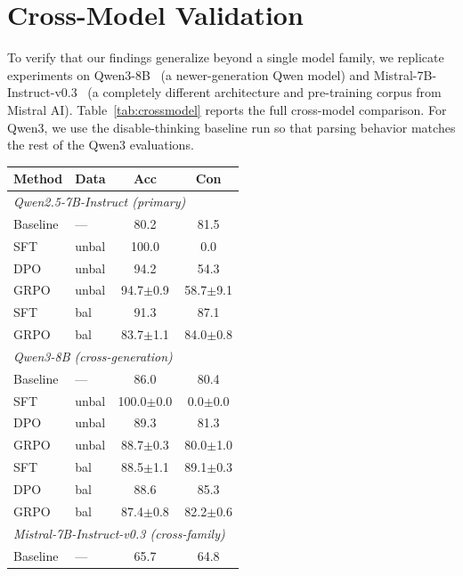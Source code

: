 \documentclass[letterpaper]{article}
\begin{document}
\section{Cross-Model Validation}
\label{app:crossmodel}

To verify that our findings generalize beyond a single model family, we replicate experiments on Qwen3-8B~\citep{qwen2025qwen3} (a newer-generation Qwen model) and Mistral-7B-Instruct-v0.3~\citep{jiang2023mistral} (a completely different architecture and pre-training corpus from Mistral AI). Table~\ref{tab:crossmodel} reports the full cross-model comparison. For Qwen3, we use the disable-thinking baseline run so that parsing behavior matches the rest of the Qwen3 evaluations.

\begin{table}[htbp]
\centering
\footnotesize
\begin{tabular}{llcc}
\toprule
\textbf{Method} & \textbf{Data} & \textbf{Acc} & \textbf{Con} \\
\midrule
\multicolumn{4}{l}{\textit{Qwen2.5-7B-Instruct (primary)}} \\
Baseline & --- & 80.2 & 81.5 \\
SFT & unbal & 100.0 & 0.0 \\
DPO & unbal & 94.2 & 54.3 \\
GRPO & unbal & 94.7{\scriptsize$\pm$0.9} & 58.7{\scriptsize$\pm$9.1} \\
SFT & bal & 91.3 & 87.1 \\
GRPO & bal & 83.7{\scriptsize$\pm$1.1} & 84.0{\scriptsize$\pm$0.8} \\
\midrule
\multicolumn{4}{l}{\textit{Qwen3-8B (cross-generation)}} \\
Baseline & --- & 86.0 & 80.4 \\
SFT & unbal & 100.0{\scriptsize$\pm$0.0} & 0.0{\scriptsize$\pm$0.0} \\
DPO & unbal & 89.3 & 81.3 \\
GRPO & unbal & 88.7{\scriptsize$\pm$0.3} & 80.0{\scriptsize$\pm$1.0} \\
SFT & bal & 88.5{\scriptsize$\pm$1.1} & 89.1{\scriptsize$\pm$0.3} \\
DPO & bal & 88.6 & 85.3 \\
GRPO & bal & 87.4{\scriptsize$\pm$0.8} & 82.2{\scriptsize$\pm$0.6} \\
\midrule
\multicolumn{4}{l}{\textit{Mistral-7B-Instruct-v0.3 (cross-family)}} \\
Baseline & --- & 65.7 & 64.8 \\

\end{tabular}
\end{table}
\end{document}

